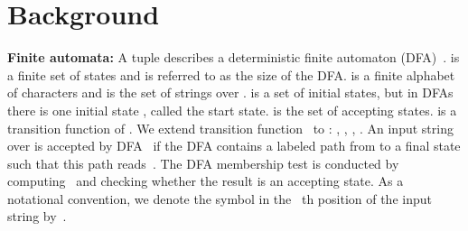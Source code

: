 \documentclass[10pt, conference, compsocconf]{IEEEtran}
\begin{document}
\section{Background}
\label{sec:background}
{\bf Finite automata:} A tuple  describes a
deterministic finite automaton (DFA)~.  is a finite set of
states and  is
referred to as the size of the DFA.  is a finite alphabet of
characters and
 is the set of strings over .
 is a set of initial states, but
in DFAs there is one initial state , called
the start state.
 is the set of accepting states.
 is a transition function of .
We extend transition function~ to :
,
, , .
An input string~ over  is accepted by DFA~ if the DFA contains a labeled
path from  to a final state such that this path reads~.
The DFA membership test is conducted by
computing~ and checking whether the result
is an accepting state.
As a notational convention, we denote the symbol
in the ~th position of the input string by~.
\end{document}
